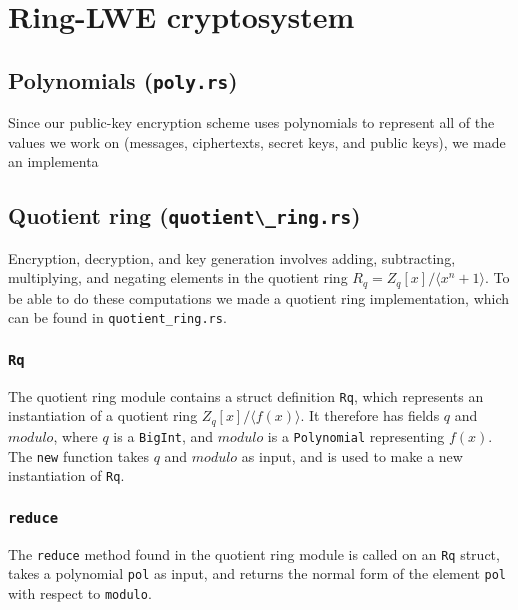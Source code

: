 \documentclass[../main.tex]{subfiles}
\begin{document}
\section{Ring-LWE cryptosystem}
\subsection{Polynomials (\lstinline{poly.rs})}

Since our public-key encryption scheme uses polynomials to represent all of the values we work on (messages, ciphertexts, secret keys, and public keys), we made an implementa

\subsection{Quotient ring (\lstinline{quotient\_ring.rs})}
Encryption, decryption, and key generation involves adding, subtracting, multiplying, and negating elements in the quotient ring $R_q = Z_q[x]/\langle x^n + 1 \rangle$. To be able to do these computations we made a quotient ring implementation, which can be found in \lstinline{quotient_ring.rs}.

\subsubsection{\lstinline{Rq}}
The quotient ring module contains a struct definition \lstinline{Rq}, which represents an instantiation of a quotient ring $Z_q[x]/\langle f(x) \rangle$. It therefore has fields $q$ and $modulo$, where $q$ is a \lstinline{BigInt}, and $modulo$ is a \lstinline{Polynomial} representing $f(x)$. The \lstinline{new} function takes $q$ and $modulo$ as input, and is used to make a new instantiation of \lstinline{Rq}.

\subsubsection{\lstinline{reduce}}
The \lstinline{reduce} method found in the quotient ring module is called on an \lstinline{Rq} struct, takes a polynomial \lstinline{pol} as input, and returns the normal form of the element \lstinline{pol} with respect to \lstinline{modulo}.
\end{document}
